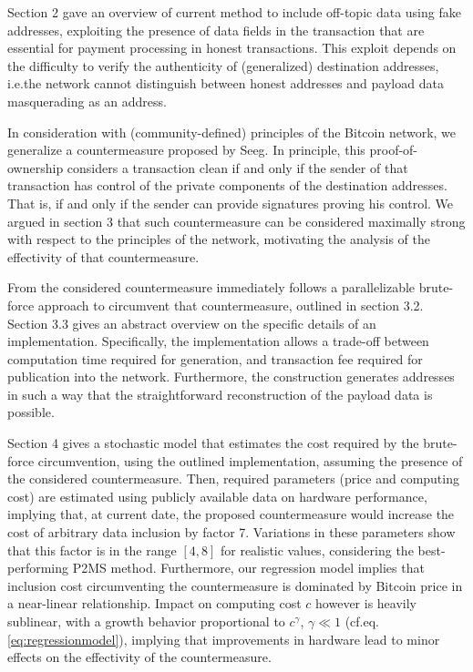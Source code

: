\documentclass[a4paper,11pt,titlepage]{scrbook}
\begin{document}
Section 2 gave an overview of current method to include off-topic data using fake addresses, exploiting the presence of data fields in the transaction that are essential for payment processing in honest transactions.
This exploit depends on the difficulty to verify the authenticity of (generalized) destination addresses, i.e.\@ the network cannot distinguish between honest addresses and payload data masquerading as an address.

In consideration with (community-defined) principles of the Bitcoin network, we generalize a countermeasure proposed by Seeg.
In principle, this proof-of-ownership considers a transaction clean if and only if the sender of that transaction has control of the private components of the destination addresses.
That is, if and only if the sender can provide signatures proving his control.
We argued in section 3 that such countermeasure can be considered maximally strong with respect to the principles of the network, motivating the analysis of the effectivity of that countermeasure.

From the considered countermeasure immediately follows a parallelizable brute-force approach to circumvent that countermeasure, outlined in section 3.2. Section 3.3 gives an abstract overview on the specific details of an implementation.
Specifically, the implementation allows a trade-off between computation time required for generation, and transaction fee required for publication into the network.
Furthermore, the construction generates addresses in such a way that the straightforward reconstruction of the payload data is possible.

Section 4 gives a stochastic model that estimates the cost required by the brute-force circumvention, using the outlined implementation, assuming the presence of the considered countermeasure.
Then, required parameters (price and computing cost) are estimated using publicly available data on hardware performance, implying that, at current date, the proposed countermeasure would increase the cost of arbitrary data inclusion by factor 7.
Variations in these parameters show that this factor is in the range $[4, 8]$ for realistic values, considering the best-performing P2MS method.
Furthermore, our regression model implies that inclusion cost circumventing the countermeasure is dominated by Bitcoin price in a near-linear relationship.
Impact on computing cost $c$ however is heavily sublinear, with a growth behavior proportional to $c^\gamma$, $\gamma \ll 1$ (cf.\@ eq.\@ \ref{eq:regressionmodel}), implying that improvements in hardware lead to minor effects on the effectivity of the countermeasure.
\end{document}

